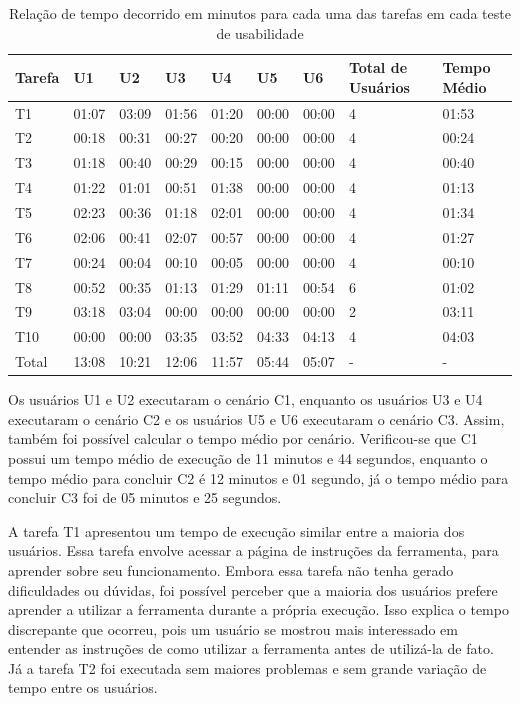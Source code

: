 \begin{table}[!htb]
    \centering
    \caption{ Relação de tempo decorrido em minutos para cada uma das tarefas em cada teste de usabilidade}
    \label{table:tempos-execucao}
    \begin{tabular}{|p{1.5cm}|p{1.2cm}|p{1.2cm}|p{1.2cm}|p{1.2cm}|p{1.2cm}|p{1.2cm}|p{1.2cm}|p{1.5cm}|}
        \hline
        Tarefa & U1 & U2 & U3 & U4 & U5 & U6 & Total de Usuários & Tempo Médio \\
        \hline
        T1 & 01:07 & 03:09 & 01:56 & 01:20 & 00:00 & 00:00 & 4 & 01:53 \\
        \hline
        T2 & 00:18 & 00:31 & 00:27 & 00:20 & 00:00 & 00:00 & 4 & 00:24 \\          
        \hline
        T3 & 01:18 & 00:40 & 00:29 & 00:15 & 00:00 & 00:00 & 4 & 00:40 \\
        \hline
        T4 & 01:22 & 01:01 & 00:51 & 01:38 & 00:00 & 00:00 & 4 & 01:13 \\
        \hline
        T5 & 02:23 & 00:36 & 01:18 & 02:01 & 00:00 & 00:00 & 4 & 01:34 \\
        \hline
        T6 & 02:06 & 00:41 & 02:07 & 00:57 & 00:00 & 00:00 & 4 & 01:27 \\
        \hline
        T7 & 00:24 & 00:04 & 00:10 & 00:05 & 00:00 & 00:00 & 4 & 00:10 \\
        \hline
        T8 & 00:52 & 00:35 & 01:13 & 01:29 & 01:11 & 00:54 & 6 & 01:02 \\
        \hline
        T9 & 03:18 & 03:04 & 00:00 & 00:00 & 00:00 & 00:00 & 2 & 03:11 \\
        \hline
        T10 & 00:00 & 00:00 & 03:35 & 03:52 & 04:33 & 04:13 & 4 & 04:03 \\
        \hline 
        Total & 13:08 & 10:21 & 12:06 & 11:57 & 05:44 & 05:07 & - & - \\
        \hline   
    \end{tabular}
\end{table}


Os usuários U1 e U2 executaram o cenário C1, enquanto os usuários U3 e U4 executaram o 
cenário C2 e os usuários U5 e U6 executaram o cenário C3. Assim, também foi possível calcular
o tempo médio por cenário. Verificou-se que C1 possui um tempo médio de execução de 11 
minutos e 44 segundos, enquanto o tempo médio para concluir C2 é 12 minutos e 01 segundo, 
já o tempo médio para concluir C3 foi de 05 minutos e 25 segundos.

A tarefa T1 apresentou um tempo de execução similar entre a maioria dos usuários. Essa tarefa 
envolve acessar a página de instruções da ferramenta, para aprender sobre seu funcionamento. 
Embora essa tarefa não tenha gerado dificuldades ou dúvidas, foi possível perceber que a 
maioria dos usuários prefere aprender a utilizar a ferramenta durante a própria execução. 
Isso explica o tempo discrepante que ocorreu, pois um usuário se mostrou mais interessado 
em entender as instruções de como utilizar a ferramenta antes de utilizá-la de fato. Já a 
tarefa T2 foi executada sem maiores problemas e sem grande variação de tempo entre os 
usuários.

